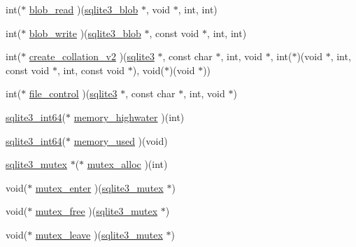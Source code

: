 \begin{DoxyCompactItemize}
\item 
int($\ast$ \hyperlink{structsqlite3__api__routines_a0813b9f5cea0e7c9fae5713e8226bb7d}{blob\+\_\+read} )(\hyperlink{sqlite3_8h_a3eb4857c157c542bb3fb7d8cbf38a662}{sqlite3\+\_\+blob} $\ast$, void $\ast$, int, int)
\item 
int($\ast$ \hyperlink{structsqlite3__api__routines_a3a402cb876e7d4e4f60d70924e5cc04d}{blob\+\_\+write} )(\hyperlink{sqlite3_8h_a3eb4857c157c542bb3fb7d8cbf38a662}{sqlite3\+\_\+blob} $\ast$, const void $\ast$, int, int)
\item 
int($\ast$ \hyperlink{structsqlite3__api__routines_a1e15da46f3dc62b421a8e3d84e83471c}{create\+\_\+collation\+\_\+v2} )(\hyperlink{sqlite3_8h_a0ef6f2646262c8a9b24368d8ac140f69}{sqlite3} $\ast$, const char $\ast$, int, void $\ast$, int($\ast$)(void $\ast$, int, const void $\ast$, int, const void $\ast$), void($\ast$)(void $\ast$))
\item 
int($\ast$ \hyperlink{structsqlite3__api__routines_a629c5e5c03b3223242357282c84af46d}{file\+\_\+control} )(\hyperlink{sqlite3_8h_a0ef6f2646262c8a9b24368d8ac140f69}{sqlite3} $\ast$, const char $\ast$, int, void $\ast$)
\item 
\hyperlink{sqlite3_8h_a0a4d3e6c1ad46f90e746b920ab6ca0d2}{sqlite3\+\_\+int64}($\ast$ \hyperlink{structsqlite3__api__routines_a92684afad13af8e23f02fd66ec04feba}{memory\+\_\+highwater} )(int)
\item 
\hyperlink{sqlite3_8h_a0a4d3e6c1ad46f90e746b920ab6ca0d2}{sqlite3\+\_\+int64}($\ast$ \hyperlink{structsqlite3__api__routines_ab97513cee1fdda32d881a206e6c89b4a}{memory\+\_\+used} )(void)
\item 
\hyperlink{sqlite3_8h_a0f546860bde03fddb33a9fed920da05c}{sqlite3\+\_\+mutex} $\ast$($\ast$ \hyperlink{structsqlite3__api__routines_aafca5fdf6433287ca14458b3c495d342}{mutex\+\_\+alloc} )(int)
\item 
void($\ast$ \hyperlink{structsqlite3__api__routines_afbf4a8e88080839fccf5dcd63ea2cee4}{mutex\+\_\+enter} )(\hyperlink{sqlite3_8h_a0f546860bde03fddb33a9fed920da05c}{sqlite3\+\_\+mutex} $\ast$)
\item 
void($\ast$ \hyperlink{structsqlite3__api__routines_acbc66bc0d281c1b113c455409bdce8ad}{mutex\+\_\+free} )(\hyperlink{sqlite3_8h_a0f546860bde03fddb33a9fed920da05c}{sqlite3\+\_\+mutex} $\ast$)
\item 
void($\ast$ \hyperlink{structsqlite3__api__routines_a7d02b385cc7de28a4a12cc2893d51f0a}{mutex\+\_\+leave} )(\hyperlink{sqlite3_8h_a0f546860bde03fddb33a9fed920da05c}{sqlite3\+\_\+mutex} $\ast$)
\item 

\end{DoxyCompactItemize}
